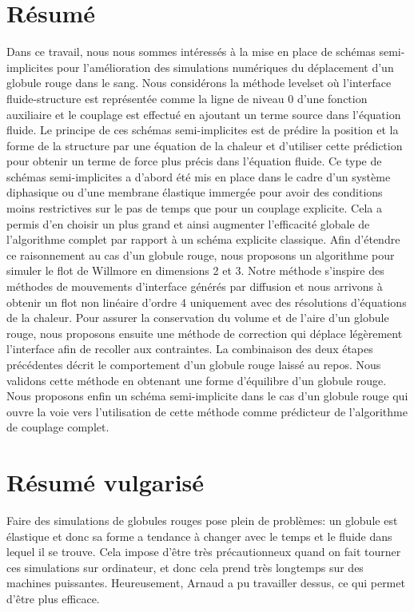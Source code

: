 \documentclass[a4paper]{leaflet}
\begin{document}
\section*{Résumé}
Dans ce travail, nous nous sommes intéressés à la mise en place de schémas semi-implicites pour l'amélioration des simulations numériques du déplacement d'un globule rouge dans le sang. Nous considérons la méthode levelset où l'interface fluide-structure est représentée comme la ligne de niveau 0 d'une fonction auxiliaire et le couplage est effectué en ajoutant un terme source dans l'équation fluide. Le principe de ces schémas semi-implicites est de prédire la position et la forme de la structure par une équation de la chaleur et d'utiliser cette prédiction pour obtenir un terme de force plus précis dans l'équation fluide. Ce type de schémas semi-implicites a d'abord été mis en place dans le cadre d'un système diphasique ou d'une membrane élastique immergée pour avoir des conditions moins restrictives sur le pas de temps que pour un couplage explicite. Cela a permis d'en choisir un plus grand et ainsi augmenter l'efficacité globale de l'algorithme complet par rapport à un schéma explicite classique. Afin d'étendre ce raisonnement au cas d'un globule rouge, nous proposons un algorithme pour simuler le flot de Willmore en dimensions 2 et 3. Notre méthode s'inspire des méthodes de mouvements d'interface générés par diffusion et nous arrivons à obtenir un flot non linéaire d'ordre 4 uniquement avec des résolutions d'équations de la chaleur. Pour assurer la conservation du volume et de l'aire d'un globule rouge, nous proposons ensuite une méthode de correction qui déplace légèrement l'interface afin de recoller aux contraintes. La combinaison des deux étapes précédentes décrit le comportement d'un globule rouge laissé au repos. Nous validons cette méthode en obtenant une forme d'équilibre d'un globule rouge. Nous proposons enfin un schéma semi-implicite dans le cas d'un globule rouge qui ouvre la voie vers l'utilisation de cette méthode comme prédicteur de l'algorithme de couplage complet.
\section*{Résumé vulgarisé}
Faire des simulations de globules rouges pose plein de problèmes: un globule est élastique et donc sa forme a tendance à changer avec le temps et le fluide dans lequel il se trouve. Cela impose d'être très précautionneux quand on fait tourner ces simulations sur ordinateur, et donc cela prend très longtemps sur des machines puissantes. Heureusement, Arnaud a pu travailler dessus, ce qui permet d'être plus efficace.
\end{document}
